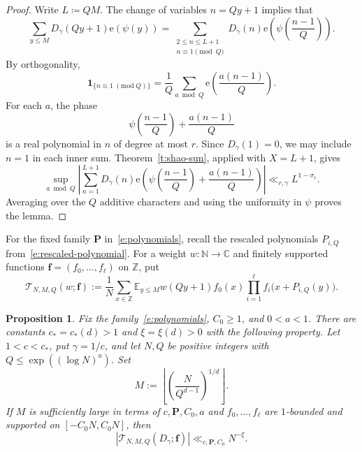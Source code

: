 \documentclass[12pt]{amsart}
\newcommand{\E}{\mathbb E}
\newcommand{\N}{\mathbb N}
\newcommand{\Z}{\mathbb Z}
\newcommand{\C}{\mathbb C}
\newcommand{\1}{\mathbf 1}
\newcommand{\e}{\mathrm e}
\newtheorem{proposition}[theorem]{Proposition}
\begin{document}
\begin{proof}
Write $L\coloneqq QM$. The change of variables $n=Qy+1$ implies that  
\[
 \sum_{y\leq M}D_\gamma(Qy+1)\e(\psi(y))
 =
 \sum_{\substack{2\leq n\leq L+1\\n\equiv1\pmod Q}}
 D_\gamma(n)\e\!\left(\psi\!\left(\frac{n-1}{Q}\right)\right).
\]
By orthogonality,
\[
 \1_{\{n\equiv1\; (\mathrm{mod}\;Q)\}}
 =\frac1Q\sum_{a\bmod Q}\e\left(\frac{a(n-1)}Q\right).
\]
For each $a$, the phase
\[
 \psi\left(\frac{n-1}Q\right)+\frac{a(n-1)}Q
\]
is a real polynomial in $n$ of degree at most $r$.
Since $D_\gamma(1)=0$, we may include $n=1$ in each inner sum.
Theorem~\ref{t:shao-sun}, applied with $X=L+1$, gives
\[
 \sup_{a\bmod Q}
 \left|\sum_{n=1}^{L+1}D_\gamma(n)
 \e\!\left(\psi\!\left(\frac{n-1}{Q}\right)
 +\frac{a(n-1)}Q\right)\right|
 \ll_{r,\gamma}L^{1-\sigma_r}.
\]
Averaging over the $Q$ additive characters and using the
uniformity in $\psi$ proves the lemma.
\end{proof}


For the fixed family $\mathbf P$ in~\eqref{e:polynomials}, recall
the rescaled polynomials $P_{i,Q}$ from~\eqref{e:rescaled-polynomial}.
For a weight $w:\N\to\C$ and finitely supported functions
$\mathbf f=(f_0,\ldots,f_\ell)$ on $\Z$, put
\begin{equation}\label{e:counting-form}
 \mathcal T_{N,M,Q}(w;\mathbf f)
 :=\frac1N\sum_{x\in\Z}\E_{y\leq M}
 w(Qy+1)f_0(x)\prod_{i=1}^{\ell}
 f_i\bigl(x+P_{i,Q}(y)\bigr).
\end{equation}


\begin{proposition}
\label{p:comparison}
Fix the family~\eqref{e:polynomials}, $C_0\geq1$, and $0<a<1$.
There are constants $c_*=c_*(d)>1$ and $\xi=\xi(d)>0$
with the following property.
Let $1<c<c_*$, put $\gamma=1/c$, and let $N,Q$ be positive
integers with $Q\leq\exp((\log N)^a)$. Set
\[
 M:=\left\lfloor\left(\frac{N}{Q^{d-1}}\right)^{1/d}\right\rfloor.
\]
If $M$ is sufficiently large in terms of $c,\mathbf P,C_0,a$
and $f_0,\ldots,f_\ell$ are $1$-bounded and supported on
$[-C_0N,C_0N]$, then
\begin{equation}\label{e:comparison}
 \left|\mathcal T_{N,M,Q}(D_\gamma;\mathbf f)\right|
 \ll_{c,\mathbf P,C_0}N^{-\xi}.
\end{equation}
\end{proposition}
\end{document}
